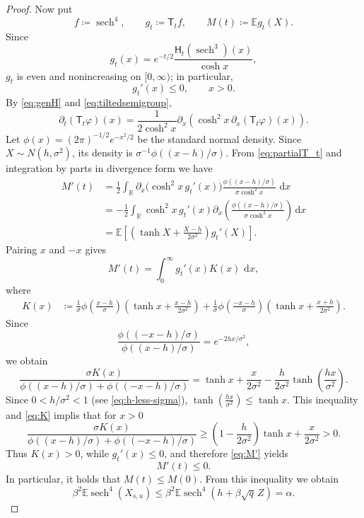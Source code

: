 \documentclass[11pt]{article}
\numberwithin{equation}{section}
\newcommand{\E}{\mathbb{E}}
\newcommand{\1}{\mathbf 1}
\newcommand{\sech}{\operatorname{sech}}
\newcommand{\dd}{\,\mathrm d}
\begin{document}
\begin{proof}
Now put
\[
 f\coloneqq\sech^4,
 \qquad
 g_t\coloneqq\mathsf T_t f,
 \qquad
 M(t)\coloneqq\E g_t(X).
\]
Since
\[
 g_t(x)
 =
 e^{-t/2}\frac{\mathsf H_t(\sech^3)(x)}{\cosh x},
\]
$g_t$ is even and nonincreasing on $[0,\infty)$; in particular,
\[
 g_t'(x)\le0,
 \qquad x>0.
\]
By \eqref{eq:genH} and \eqref{eq:tiltedsemigroup},
\begin{equation}\label{eq:partialT_t}
 \partial_t(\mathsf T_t\varphi)(x)
 =\frac{1}{2\cosh^2x}\partial_x\left(
   \cosh^2x\,\partial_x(\mathsf T_t\varphi)(x)
  \right).
\end{equation}
Let $\phi(x)=(2\pi)^{-1/2}e^{-x^2/2}$ be the standard normal density.
Since $X\sim N(h,\sigma^2)$, its density is
$\sigma^{-1}\phi((x-h)/\sigma)$.
From \eqref{eq:partialT_t} and integration by parts
in divergence form we have
\[
 \begin{aligned}
 M'(t)
 &=\frac12\int_{\mathbb R}
   \partial_x\bigl(\cosh^2x\,g_t'(x)\bigr)
   \frac{\phi((x-h)/\sigma)}{\sigma\cosh^2x}\,\dd x\\
 &=-\frac12\int_{\mathbb R}\cosh^2x\,g_t'(x)
   \partial_x\left(
     \frac{\phi((x-h)/\sigma)}{\sigma\cosh^2x}
   \right)\dd x\\
 &=\E\left[
   \left(\tanh X+\frac{X-h}{2\sigma^2}\right)g_t'(X)
 \right].
 \end{aligned}
\]
Pairing $x$ and $-x$
gives
\begin{equation}\label{eq:M'}
 M'(t)=\int_0^\infty g_t'(x)K(x)\,\dd x,
\end{equation}
where
\[
 \begin{aligned}
 K(x)
 &\coloneqq
 \frac1\sigma\phi\left(\frac{x-h}{\sigma}\right)
 \left(\tanh x+\frac{x-h}{2\sigma^2}\right)+
 \frac1\sigma\phi\left(\frac{-x-h}{\sigma}\right)
 \left(\tanh x+\frac{x+h}{2\sigma^2}\right).
 \end{aligned}
\]
Since
\[
 \frac{\phi((-x-h)/\sigma)}{\phi((x-h)/\sigma)}
 =e^{-2hx/\sigma^2},
\]
we obtain
\[
 \frac{\sigma K(x)}{
  \phi((x-h)/\sigma)+\phi((-x-h)/\sigma)}
 =
 \tanh x+\frac{x}{2\sigma^2}
 -\frac{h}{2\sigma^2}\tanh\left(\frac{hx}{\sigma^2}\right).
\]
Since $0<h/\sigma^2<1$ (see \eqref{eq:h-less-sigma}),
\(
 \tanh\left(\frac{hx}{\sigma^2}\right)\le\tanh x .
\)
This inequality and \eqref{eq:K} implis that for $x>0$
\[
 \frac{\sigma K(x)}{
  \phi((x-h)/\sigma)+\phi((-x-h)/\sigma)}
 \ge
 \left(1-\frac{h}{2\sigma^2}\right)\tanh x
 +\frac{x}{2\sigma^2}
 >0.
\]
Thus $K(x)>0$, while $g_t'(x)\le0$, and therefore \eqref{eq:M'} yields
\[
 M'(t)\le0.
\]
In particular, it holds that $M(t)\le M(0)$. From this inequality we obtain
\[
 \beta^2\E\sech^4(X_{s,u})
 \le
 \beta^2\E\sech^4(h+\beta\sqrt q\,Z)
 =\alpha.
\]
\end{proof}
\end{document}
